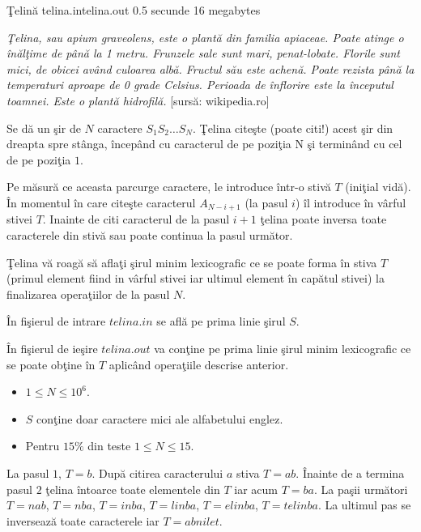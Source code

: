 \begin{problem}{\c{T}elin\u{a}}
{telina.in}{telina.out}
{0.5 secunde} {16 megabytes}{}

\emph{\c{T}elina, sau apium graveolens, este o plant\u{a} din familia apiaceae. Poate atinge o \^{i}n\u{a}l\c{t}ime de p\^{a}n\u{a} la 1 metru. Frunzele sale sunt mari, penat-lobate. Florile sunt mici, de obicei av\^{a}nd culoarea alb\u{a}. Fructul s\u{a}u este achen\u{a}. Poate rezista p\^{a}n\u{a} la temperaturi aproape de 0 grade Celsius. Perioada de \^{i}nflorire este la începutul toamnei. Este o plant\u{a} hidrofil\u{a}.} [surs\u{a}: wikipedia.ro]

Se d\u{a} un \c{s}ir de $N$ caractere $S_1S_2 \dots S_N$. \c{T}elina cite\c{s}te (poate citi!) acest \c{s}ir din dreapta spre st\^{a}nga, \^{i}ncep\^{a}nd cu caracterul de pe pozi\c{t}ia N \c{s}i termin\^{a}nd cu cel de pe pozi\c{t}ia $1$.

Pe m\u{a}sur\u{a} ce aceasta parcurge caractere, le introduce \^{i}ntr-o stiv\u{a} $T$ (ini\c{t}ial vid\u{a}). \^{I}n momentul \^{i}n care cite\c{s}te caracterul $A_{N-i + 1}$ (la pasul $i$) \^{i}l introduce \^{i}n v\^{a}rful stivei $T$. Inainte de citi caracterul de la pasul $i+1$ \c{t}elina poate inversa toate caracterele din stiv\u{a} sau poate continua la pasul urm\u{a}tor.

\c{T}elina v\u{a} roag\u{a} s\u{a} afla\c{t}i \c{s}irul minim lexicografic ce se poate forma \^{i}n stiva $T$ (primul element fiind in v\^{a}rful stivei iar ultimul element \^{i}n cap\u{a}tul stivei) la finalizarea opera\c{t}iilor de la pasul $N$.


\InputFile

\^{I}n fi\c{s}ierul de intrare $telina.in$ se afl\u{a} pe prima linie \c{s}irul $S$.

\OutputFile

\^{I}n fişierul de ie\c{s}ire $telina.out$ va con\c{t}ine pe prima linie \c{s}irul minim lexicografic ce se poate ob\c{t}ine \^{i}n $T$ aplic\^{a}nd opera\c{t}iile descrise anterior.

\Notes
\begin{itemize}
	\setlength{\itemsep}{1pt}
  	\setlength{\parskip}{0pt}
  	\setlength{\parsep}{0pt}
	\item $1 \le N \le 10^{6}$.
	\item $S$ con\c{t}ine doar caractere mici ale alfabetului englez.
	\item Pentru $15 \%$ din teste $1 \le N \le 15$.
\end{itemize}

\Example

\begin{example}
%
\end{example}

\Explanation

La pasul $1$, $T = b$. Dup\u{a} citirea caracterului $a$ stiva $T = ab$. \^{I}nainte de a termina pasul $2$ \c{t}elina \^{i}ntoarce toate elementele din $T$ iar acum $T = ba$. La pa\c{s}ii urm\u{a}tori $T = nab$, $T = nba$, $T = inba$, $T = linba$, $T = elinba$, $T = telinba$. La ultimul pas se inverseaz\u{a} toate caracterele iar $T = abnilet$.

\end{problem}
